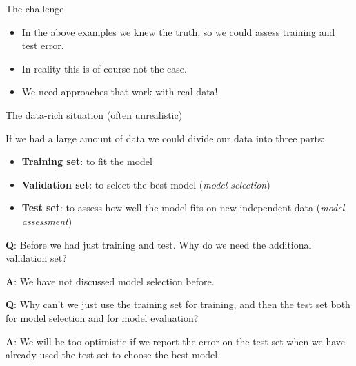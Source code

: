 \documentclass[10pt,ignorenonframetext,]{beamer}
\providecommand{\tightlist}{%
  \setlength{\itemsep}{0pt}\setlength{\parskip}{0pt}}
\begin{document}
\begin{frame}

\begin{block}{The challenge}

\vspace{2mm}

\begin{itemize}
\item
  In the above examples we knew the truth, so we could assess training
  and test error.
\item
  In reality this is of course not the case.
\item
  We need approaches that work with real data!
\end{itemize}

\end{block}

\end{frame}

\begin{frame}

\begin{block}{The data-rich situation (often unrealistic)}

\vspace{2mm} If we had a large amount of data we could divide our data
into three parts:

\begin{itemize}
\tightlist
\item
  \textbf{Training set}: to fit the model
\item
  \textbf{Validation set}: to select the best model (\emph{model
  selection})
\item
  \textbf{Test set}: to assess how well the model fits on new
  independent data (\emph{model assessment})
\end{itemize}

\vspace{2mm}

\textbf{Q}: Before we had just training and test. Why do we need the
additional validation set?

\textbf{A}: We have not discussed model selection before.

\textbf{Q}: Why can't we just use the training set for training, and
then the test set both for model selection and for model evaluation?

\textbf{A}: We will be too optimistic if we report the error on the test
set when we have already used the test set to choose the best model.

\end{block}

\end{frame}
\end{document}

